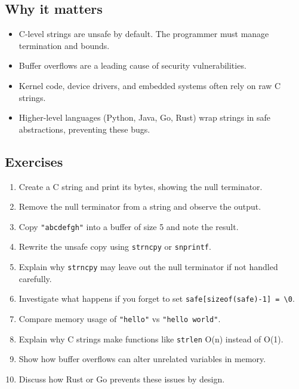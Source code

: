 \documentclass[
  letterpaper,
  DIV=11,
  numbers=noendperiod]{scrreprt}
\providecommand{\tightlist}{%
  \setlength{\itemsep}{0pt}\setlength{\parskip}{0pt}}
\begin{document}
\subsection{Why it matters}\label{why-it-matters-47}

\begin{itemize}
\tightlist
\item
  C-level strings are unsafe by default. The programmer must manage
  termination and bounds.
\item
  Buffer overflows are a leading cause of security vulnerabilities.
\item
  Kernel code, device drivers, and embedded systems often rely on raw C
  strings.
\item
  Higher-level languages (Python, Java, Go, Rust) wrap strings in safe
  abstractions, preventing these bugs.
\end{itemize}

\subsection{Exercises}\label{exercises-46}

\begin{enumerate}
\def\labelenumi{\arabic{enumi}.}
\tightlist
\item
  Create a C string and print its bytes, showing the null terminator.
\item
  Remove the null terminator from a string and observe the output.
\item
  Copy \texttt{"abcdefgh"} into a buffer of size 5 and note the result.
\item
  Rewrite the unsafe copy using \texttt{strncpy} or \texttt{snprintf}.
\item
  Explain why \texttt{strncpy} may leave out the null terminator if not
  handled carefully.
\item
  Investigate what happens if you forget to set
  \texttt{safe{[}sizeof(safe)-1{]}\ =\ \textquotesingle{}\textbackslash{}0\textquotesingle{}}.
\item
  Compare memory usage of \texttt{"hello"} vs \texttt{"hello\ world"}.
\item
  Explain why C strings make functions like \texttt{strlen} O(n) instead
  of O(1).
\item
  Show how buffer overflows can alter unrelated variables in memory.
\item
  Discuss how Rust or Go prevents these issues by design.
\end{enumerate}
\end{document}
